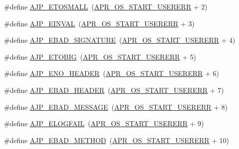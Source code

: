 \begin{DoxyCompactItemize}
\item 
\#define \hyperlink{group__AJP__defines_ga65ff90064dc08c72a1304e29a9459ce3}{A\+J\+P\+\_\+\+E\+T\+O\+S\+M\+A\+LL}~(\hyperlink{group__apr__errno_gacd35b2de1e38a1fa4717e38d5e153571}{A\+P\+R\+\_\+\+O\+S\+\_\+\+S\+T\+A\+R\+T\+\_\+\+U\+S\+E\+R\+E\+RR} + 2)
\item 
\#define \hyperlink{group__AJP__defines_gac504b080e053999b8a8486e9e3bcdb50}{A\+J\+P\+\_\+\+E\+I\+N\+V\+AL}~(\hyperlink{group__apr__errno_gacd35b2de1e38a1fa4717e38d5e153571}{A\+P\+R\+\_\+\+O\+S\+\_\+\+S\+T\+A\+R\+T\+\_\+\+U\+S\+E\+R\+E\+RR} + 3)
\item 
\#define \hyperlink{group__AJP__defines_ga715882195056aa5a9af399317e0a5f3d}{A\+J\+P\+\_\+\+E\+B\+A\+D\+\_\+\+S\+I\+G\+N\+A\+T\+U\+RE}~(\hyperlink{group__apr__errno_gacd35b2de1e38a1fa4717e38d5e153571}{A\+P\+R\+\_\+\+O\+S\+\_\+\+S\+T\+A\+R\+T\+\_\+\+U\+S\+E\+R\+E\+RR} + 4)
\item 
\#define \hyperlink{group__AJP__defines_ga4206d705399c54dd9bb3872b71703437}{A\+J\+P\+\_\+\+E\+T\+O\+B\+IG}~(\hyperlink{group__apr__errno_gacd35b2de1e38a1fa4717e38d5e153571}{A\+P\+R\+\_\+\+O\+S\+\_\+\+S\+T\+A\+R\+T\+\_\+\+U\+S\+E\+R\+E\+RR} + 5)
\item 
\#define \hyperlink{group__AJP__defines_ga10519c773d21b00722154026a429c4e0}{A\+J\+P\+\_\+\+E\+N\+O\+\_\+\+H\+E\+A\+D\+ER}~(\hyperlink{group__apr__errno_gacd35b2de1e38a1fa4717e38d5e153571}{A\+P\+R\+\_\+\+O\+S\+\_\+\+S\+T\+A\+R\+T\+\_\+\+U\+S\+E\+R\+E\+RR} + 6)
\item 
\#define \hyperlink{group__AJP__defines_gad47f3550404d4ddbaf685fd6ba47097b}{A\+J\+P\+\_\+\+E\+B\+A\+D\+\_\+\+H\+E\+A\+D\+ER}~(\hyperlink{group__apr__errno_gacd35b2de1e38a1fa4717e38d5e153571}{A\+P\+R\+\_\+\+O\+S\+\_\+\+S\+T\+A\+R\+T\+\_\+\+U\+S\+E\+R\+E\+RR} + 7)
\item 
\#define \hyperlink{group__AJP__defines_gae932110a9c8d5488cfef2e8ac4636d18}{A\+J\+P\+\_\+\+E\+B\+A\+D\+\_\+\+M\+E\+S\+S\+A\+GE}~(\hyperlink{group__apr__errno_gacd35b2de1e38a1fa4717e38d5e153571}{A\+P\+R\+\_\+\+O\+S\+\_\+\+S\+T\+A\+R\+T\+\_\+\+U\+S\+E\+R\+E\+RR} + 8)
\item 
\#define \hyperlink{group__AJP__defines_gac91803513822e604037319ce965f8715}{A\+J\+P\+\_\+\+E\+L\+O\+G\+F\+A\+IL}~(\hyperlink{group__apr__errno_gacd35b2de1e38a1fa4717e38d5e153571}{A\+P\+R\+\_\+\+O\+S\+\_\+\+S\+T\+A\+R\+T\+\_\+\+U\+S\+E\+R\+E\+RR} + 9)
\item 
\#define \hyperlink{group__AJP__defines_ga4c16aa24a65af2d8a7ffee672222745a}{A\+J\+P\+\_\+\+E\+B\+A\+D\+\_\+\+M\+E\+T\+H\+OD}~(\hyperlink{group__apr__errno_gacd35b2de1e38a1fa4717e38d5e153571}{A\+P\+R\+\_\+\+O\+S\+\_\+\+S\+T\+A\+R\+T\+\_\+\+U\+S\+E\+R\+E\+RR} + 10)

\end{DoxyCompactItemize}
